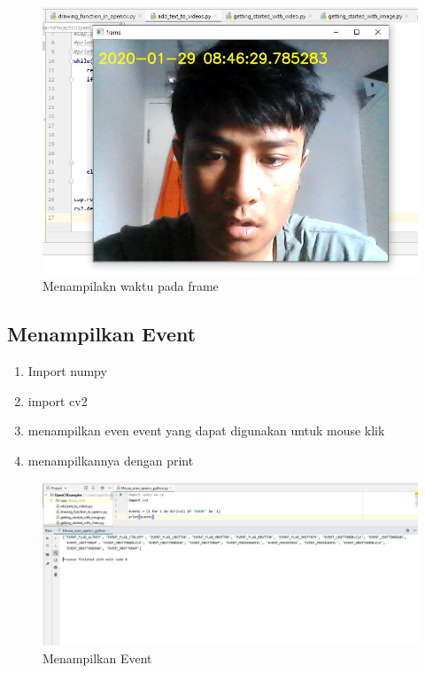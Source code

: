 \begin{figure}[ht]
\centering
\includegraphics[scale=0.5]{figures/2,18.jpg}
\caption{Menampilakn waktu pada frame}
\label{contoh}
\end{figure}



\newpage
\subsection{Menampilkan Event}

\begin{enumerate}
	\item Import numpy
	\item import cv2
	\item menampilkan even event yang dapat digunakan untuk mouse klik
	\item menampilkannya dengan print
\end{enumerate}

\begin{figure}[ht]
\centering
\includegraphics[scale=0.5]{figures/2,19.jpg}
\caption{Menampilkan Event}
\label{contoh}
\end{figure}



